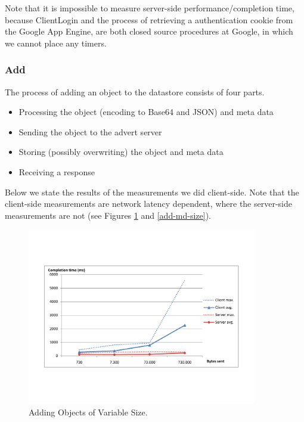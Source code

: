 Note that it is impossible to measure server-side performance/completion time,
because ClientLogin and the process of retrieving a authentication cookie from the
Google App Engine, are both closed source procedures at Google, in which we
cannot place any timers.

\subsubsection{Add}
The process of adding an object to the datastore consists of four parts.

\begin{itemize}
  \item Processing the object (encoding to Base64 and JSON) and meta data
  \item Sending the object to the advert server
  \item Storing (possibly overwriting) the object and meta data
  \item Receiving a response
\end{itemize}

Below we state the results of the measurements we did client-side. Note that
the client-side measurements are network latency dependent, where the
server-side measurements are not (see Figures \ref{add-obj-size} and
\ref{add-md-size}).

\begin{figure} %
\begin{center}
\includegraphics[trim=5cm 4cm 5cm 5cm,width=10cm]{./figures/add_obj.pdf}
\caption{Adding Objects of Variable Size. \label{add-obj-size}}
\end{center}
\end{figure}

